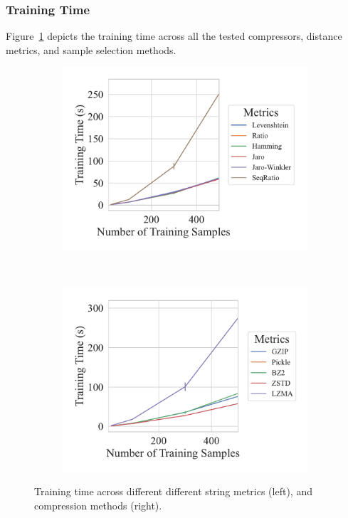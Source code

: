 \subsubsection{Training Time}

Figure~\ref{fig:kdd_nsl_training_time} depicts the training time across all the tested compressors, distance metrics, and sample selection methods.

\begin{figure}[h!]
    \centering
    \captionsetup[subfigure]{skip=0pt}
	\begin{subfigure}[t]{.44\textwidth}
		\centering
		\includegraphics[width=\textwidth]{figs/kdd_nsl/string_metric_vs_train_time.pdf}
	\end{subfigure}
	~
	\begin{subfigure}[t]{.44\textwidth}
		\centering
		\includegraphics[width=\textwidth]{figs/kdd_nsl/compressor_metric_vs_train_time.pdf}
	\end{subfigure}
	\caption{Training time across different different string  metrics (left), and compression methods (right).}
	\label{fig:kdd_nsl_training_time}
\end{figure}


